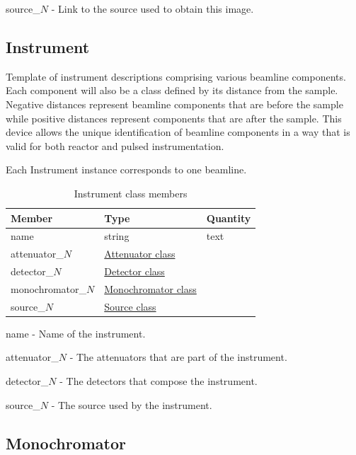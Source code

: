 \documentclass[usletter,11pt]{article}
\newcommand{\member}[2]
{ \noindent
{ \color{softBlue}  #1 - } #2
\vspace{0.2cm}
}
\begin{document}
\member{source\_$N$}{Link to the source used to obtain this image.}

\subsection{Instrument}
\label{table:instrument}

Template of instrument descriptions comprising various beamline
components. Each component will also be a class defined by its
distance from the sample. Negative distances represent beamline
components that are before the sample while positive distances
represent components that are after the sample. This device allows the
unique identification of beamline components in a way that is valid
for both reactor and pulsed instrumentation.

 Each Instrument instance
corresponds to one beamline.

\begin{table}[h!]\sffamily \footnotesize
\caption{Instrument class members}

\begin{tabular}{p{4.5cm} p{4.5cm}  p{2.5cm} }

\toprule
\bfseries Member     & \bfseries Type & \bfseries Quantity \\
\midrule

name & string & text \\
attenuator\_$N$ &  \hyperref[table:attenuator]{Attenuator class} & \\
detector\_$N$ &  \hyperref[table:detector]{Detector class} & \\
monochromator\_$N$ &  \hyperref[table:monochromator]{Monochromator class} & \\
source\_$N$ &  \hyperref[table:source]{Source class} & \\
\bottomrule
\end{tabular}
\end{table}

\member{name}{Name of the instrument.}

\member{attenuator\_$N$}{The attenuators that are part of the
 instrument.}

\member{detector\_$N$}{The detectors that compose the instrument.}

\member{source\_$N$}{The source used by the instrument.}

\subsection{Monochromator}
\label{table:monochromator}
\end{document}
